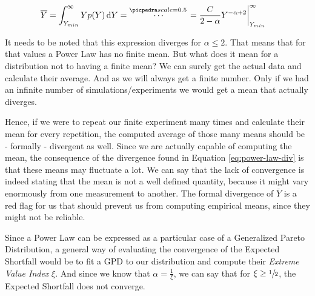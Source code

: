 \begin{align}\label{eq:power-law-div}
\begin{split}
    \overline{Y} &= \int_{Y_{min}}^{\infty}Yp(Y)\dd{Y} =
    \pedra
    = \frac{C}{2 - \alpha}Y^{-\alpha + 2}\biggr\rvert_{Y_{min}}^{\infty}
\end{split}
\end{align}

It needs to be noted that this expression diverges for $\alpha \leq 2$. That means that for that values a Power Law has no finite mean. But what does it mean for a distribution not to having a finite mean? We can surely get the actual data and calculate their average. And as we will always get a finite number. Only if we had an infinite number of simulations/experiments we would get a mean that actually diverges.

Hence, if we were to repeat our finite experiment many times and calculate their mean for every repetition, the computed average of those many means should be - formally - divergent as well. Since we are actually capable of computing the mean, the consequence of the divergence found in Equation \ref{eq:power-law-div} is that these means may fluctuate a lot. We can say that the lack of convergence is indeed stating that the mean is not a well defined quantity, because it might vary enormously from one measurement to another. The formal divergence of $\overline{Y}$ is a red flag for us that should prevent us from computing empirical means, since they might not be reliable.

Since a Power Law can be expressed as a particular case of a Generalized Pareto Distribution, a general way of evaluating the convergence of the Expected Shortfall would be to fit a GPD to our distribution and compute their \emph{Extreme Value Index} $\xi$. And since we know that $\alpha = \frac{1}{\xi}$, we can say that for $\xi \geq \sfrac{1}{2}$, the Expected Shortfall does not converge.

